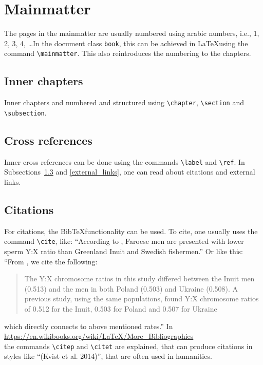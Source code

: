 \documentclass[a4paper,12pt,twoside,openright,titlepage]{book}
\begin{document}
\section{Mainmatter}
The pages in the mainmatter are usually numbered using arabic numbers, i.e., 1, 2, 3, 4, \ldots In the document class \texttt{book}, this can be achieved in \LaTeX using the command 
\texttt{\textbackslash mainmatter}. This also reintroduces the numbering to the chapters.

\subsection{Inner chapters}
Inner chapters and numbered and structured using \texttt{\textbackslash chapter}, \texttt{\textbackslash section} and \texttt{\textbackslash subsection}. 


\subsection{Cross references}

Inner cross references can be done using the commands \texttt{\textbackslash label} and \texttt{\textbackslash ref}. In Subsections~\ref{citations} and \ref{external_links}, one can read about citations and external links. 

\subsection{Citations}
\label{citations}
For citations, the Bib\TeX functionality can be used. To cite, one usually uses the command \texttt{\textbackslash cite}, like: ``According to \cite{kvist_serum},  Faroese men are presented with lower sperm Y:X ratio than Greenland Inuit and Swedish fishermen.'' Or like this: ``From \cite[p. 649]{kvist_exposure}, we cite the following:
\begin{quote}
The Y:X chromosome ratios in this study differed between the Inuit men (0.513) and the men in both Poland (0.503) and Ukraine (0.508). A previous study, using the same populations, found Y:X chromosome ratios of 0.512 for the Inuit, 0.503 for Poland and 0.507 for Ukraine
\end{quote}
which directly connects to above mentioned rates.''
In \\
\url{https://en.wikibooks.org/wiki/LaTeX/More_Bibliographies}\\ 
the commands \texttt{\textbackslash citep} and \texttt{\textbackslash citet} are explained, that can produce citations in styles like ``(Kvist et al. 2014)'', that are often used in humanities. 
\end{document}
